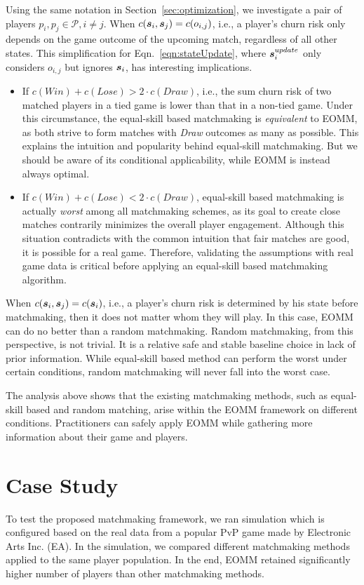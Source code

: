 Using the same notation in Section~\ref{sec:optimization}, we investigate a pair of players $p_i, p_j \in \mathcal{P}, i \neq j$. When $c(\boldsymbol{s}_i, \boldsymbol{s}_j) = c(o_{i,j})$, i.e., a player's churn risk only depends on the game outcome of the upcoming match, regardless of all other states. This simplification for Eqn.~\ref{eqn:stateUpdate}, where $\boldsymbol{s}_i^{update}$ only considers $o_{i,j}$ but ignores $\boldsymbol{s}_i$, has  interesting implications.
\begin{itemize}
\item If $c(Win)+c(Lose) > 2\cdot c(Draw)$, i.e., the sum churn risk of two matched players in a tied game is lower than that in a non-tied game. Under this circumstance, the equal-skill based matchmaking is \emph{equivalent} to EOMM, as both strive to form matches with \emph{Draw} outcomes as many as possible. This explains the intuition and popularity behind equal-skill matchmaking. But we should be aware of its conditional applicability, while EOMM is instead always optimal.
\item If $c(Win) + c(Lose)< 2\cdot c(Draw)$, equal-skill based matchmaking is actually \emph{worst} among all matchmaking schemes, as its goal to create close matches contrarily minimizes the overall player engagement. Although this situation contradicts with the common intuition that fair matches are good, it is possible for a real game. Therefore, validating the assumptions with real game data is critical before applying an equal-skill based matchmaking algorithm.
\end{itemize}

When $c(\boldsymbol{s}_i, \boldsymbol{s}_j) = c(\boldsymbol{s}_i)$, i.e., a player's churn risk is determined by his state before matchmaking, then it does not matter whom they will play. In this case, EOMM can do no better than a random matchmaking. Random matchmaking, from this perspective, is not trivial. It is a relative safe and stable baseline choice in lack of prior information. While equal-skill based method can perform the worst under certain conditions, random matchmaking will never fall into the worst case.

The analysis above shows that the existing matchmaking methods, such as equal-skill based and random matching, arise within the EOMM framework on different conditions. Practitioners can safely apply EOMM while gathering more information about their game and players.

\section{Case Study}\label{sec:casestudy}
To test the proposed matchmaking framework, we ran simulation which is configured based on the real data from a popular PvP game made by Electronic Arts Inc.\! (EA). In the simulation, we compared different matchmaking methods applied to the same player population. In the end, EOMM retained significantly higher number of players than other matchmaking methods.

